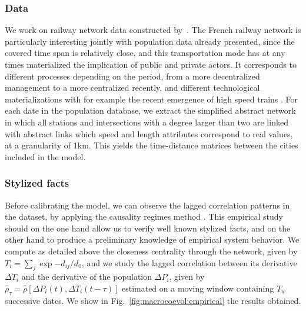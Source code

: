 \documentclass[11pt]{article}
\begin{document}
\subsubsection{Data}

We work on railway network data constructed by~\cite{thevenin2013mapping}. The French railway network is particularly interesting jointly with population data already presented, since the covered time span is relatively close, and this transportation mode has at any times materialized the implication of public and private actors. It corresponds to different processes depending on the period, from a more decentralized management to a more centralized recently, and different technological materializations with for example the recent emergence of high speed trains \citep{zembri1997fondements}. For each date in the population database, we extract the simplified abstract network in which all stations and intersections with a degree larger than two are linked with abstract links which speed and length attributes correspond to real values, at a granularity of 1km. This yields the time-distance matrices between the cities included in the model.



\subsubsection{Stylized facts}


Before calibrating the model, we can observe the lagged correlation patterns in the dataset, by applying the causality regimes method \citep{raimbault2017identification}. This empirical study should on the one hand allow us to verify well known stylized facts, and on the other hand to produce a preliminary knowledge of empirical system behavior. We compute as detailed above the closeness centrality through the network, given by $T_i = \sum_j \exp{-d_{ij}/d_0}$, and we study the lagged correlation between its derivative $\Delta T_i$ and the derivative of the population $\Delta P_i$, given by $\hat{\rho}_{\tau} = \hat{\rho}\left[\Delta P_i(t),\Delta T_i(t-\tau)\right]$ estimated on a moving window containing $T_w$ successive dates. We show in Fig.~\ref{fig:macrocoevol:empirical} the results obtained.
\end{document}
